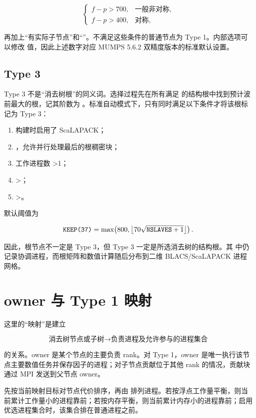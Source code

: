 \[
\begin{cases}
f-p>700, & \text{一般非对称},\\
f-p>400, & \text{对称},
\end{cases}
\]

再加上“有实际子节点”和“”。不满足这些条件的普通节点为 Type 1。内部选项可以修改  值，因此上述数字对应 MUMPS 5.6.2 双精度版本的标准默认设置\cite{mumpssource}。

\subsection{Type 3}

Type 3 不是“消去树根”的同义词。选择过程先在所有满足  的结构根中找到预计波前最大的根，记其阶数为 。标准自动模式下，只有同时满足以下条件才将该根标记为 Type 3：

\begin{enumerate}
  \item 构建时启用了 ScaLAPACK；
  \item {}，允许并行处理最后的根稠密块；
  \item 工作进程数 >1；
  \item {}>；
  \item {}>。
\end{enumerate}

默认阈值为

\[
\texttt{KEEP(37)}=
\max\!\left(800,\left\lfloor70\sqrt{\texttt{NSLAVES}+1}\right\rfloor\right).
\]

因此，根节点不一定是 Type 3，但 Type 3 一定是所选消去树的结构根。其  中仍记录协调进程，而根矩阵和数值计算随后分布到二维 BLACS/ScaLAPACK 进程网格\cite{mumpssource}。

\section{owner 与 Type 1 映射}

这里的“映射”是建立

\[
\text{消去树节点或子树}
\longrightarrow
\text{负责进程及允许参与的进程集合}
\]

的关系。owner 是某个节点的主要负责 rank。对 Type 1，owner 是唯一执行该节点主要数值任务并保存因子的进程；对子节点贡献位于其他 rank 的情况，贡献块通过 MPI 发送到父节点 owner。

 先按当前映射目标对节点代价排序，再由  排列进程。若按浮点工作量平衡，则当前累计工作量小的进程靠前；若按内存平衡，则当前累计内存小的进程靠前；启用优选进程集合时，该集合排在普通进程之前。

